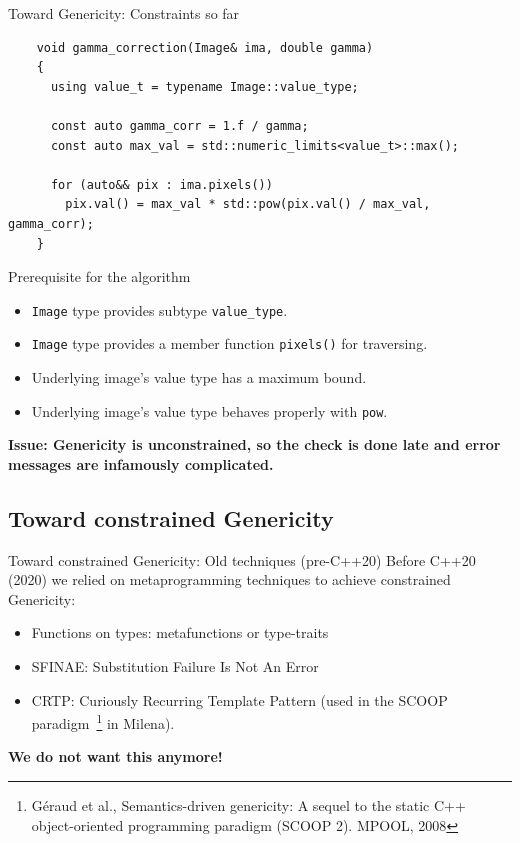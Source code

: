 \documentclass[12pt,aspectratio=169]{beamer}
\begin{document}
\begin{frame}[fragile]{Toward Genericity: Constraints so far}
  \begin{verbatim}
    void gamma_correction(Image& ima, double gamma)
    {
      using value_t = typename Image::value_type;

      const auto gamma_corr = 1.f / gamma;
      const auto max_val = std::numeric_limits<value_t>::max();
    
      for (auto&& pix : ima.pixels())
        pix.val() = max_val * std::pow(pix.val() / max_val, gamma_corr);
    }
  \end{verbatim}
  \begin{alertblock}{Prerequisite for the algorithm}
    \begin{itemize}
      \item \texttt{Image} type provides subtype \texttt{value\_type}.
      \item \texttt{Image} type provides a member function \texttt{pixels()} for traversing.
      \item Underlying image's value type has a maximum bound.
      \item Underlying image's value type behaves properly with \texttt{pow}.
    \end{itemize}
  \end{alertblock}
  \textbf{Issue: Genericity is unconstrained, so the check is done late and error messages are infamously complicated.}
\end{frame}


\subsection[Toward constrained Genericity]{Toward constrained Genericity}

\begin{frame}[fragile]{Toward constrained Genericity: Old techniques (pre-C++20)}
  Before C++20 (2020) we relied on metaprogramming techniques to achieve constrained Genericity:
  \vspace{-0.2cm}\begin{itemize}
    \item Functions on types: metafunctions or type-traits
    \item SFINAE: Substitution Failure Is Not An Error
    \item CRTP: Curiously Recurring Template Pattern (used in the SCOOP paradigm~\footnote{G\'{e}raud et al.,
          Semantics-driven genericity: A sequel to the static C++ object-oriented programming paradigm (SCOOP 2). MPOOL,
          2008} in Milena).
  \end{itemize}
  \vspace{-0.3cm}
  \begin{center}\textbf{We do not want this anymore!}\end{center}
\end{frame}
\end{document}
